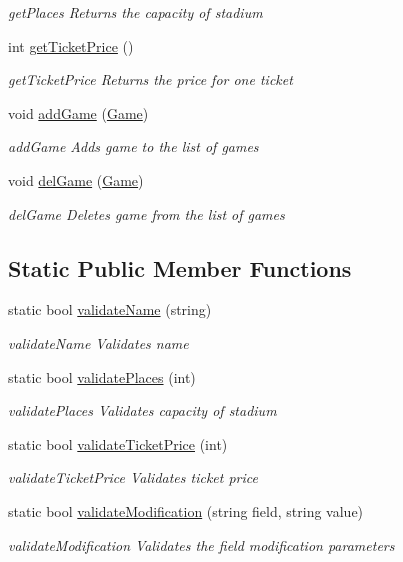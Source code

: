 \begin{DoxyCompactItemize}
\begin{DoxyCompactList}\small\item\em get\-Places Returns the capacity of stadium \end{DoxyCompactList}\item 
int \hyperlink{class_stadium_a79956c14de1980a685000cae1fc4ae6a}{get\-Ticket\-Price} ()
\begin{DoxyCompactList}\small\item\em get\-Ticket\-Price Returns the price for one ticket \end{DoxyCompactList}\item 
void \hyperlink{class_stadium_a1d50650f511946c37c5595de7596ad1a}{add\-Game} (\hyperlink{class_game}{Game})
\begin{DoxyCompactList}\small\item\em add\-Game Adds game to the list of games \end{DoxyCompactList}\item 
void \hyperlink{class_stadium_a7509d7bae6f4adf095801198d1860913}{del\-Game} (\hyperlink{class_game}{Game})
\begin{DoxyCompactList}\small\item\em del\-Game Deletes game from the list of games \end{DoxyCompactList}\end{DoxyCompactItemize}
\subsection*{Static Public Member Functions}
\begin{DoxyCompactItemize}
\item 
static bool \hyperlink{class_stadium_a54f137ce795722af818e63f5aa10ee1b}{validate\-Name} (string)
\begin{DoxyCompactList}\small\item\em validate\-Name Validates name \end{DoxyCompactList}\item 
static bool \hyperlink{class_stadium_a7599de7fb2e47a9033843b3daf021b3b}{validate\-Places} (int)
\begin{DoxyCompactList}\small\item\em validate\-Places Validates capacity of stadium \end{DoxyCompactList}\item 
static bool \hyperlink{class_stadium_a838f88701c34b79d69f32ca56ad187f6}{validate\-Ticket\-Price} (int)
\begin{DoxyCompactList}\small\item\em validate\-Ticket\-Price Validates ticket price \end{DoxyCompactList}\item 
static bool \hyperlink{class_stadium_aff6aa9a03327fc1b663e6c54984fe6bd}{validate\-Modification} (string field, string value)
\begin{DoxyCompactList}\small\item\em validate\-Modification Validates the field modification parameters \end{DoxyCompactList}\end{DoxyCompactItemize}
